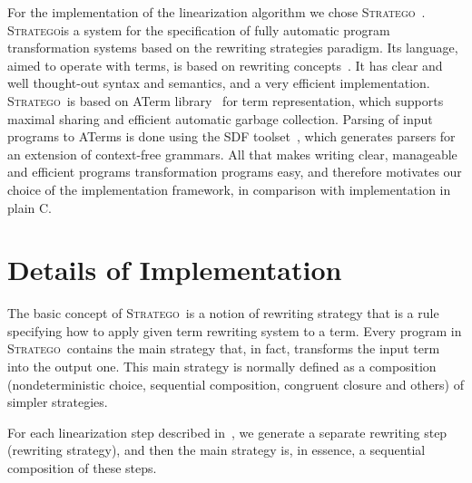 \documentclass[fleqn]{llncs}
\newcommand{\stratego}{\textsc{Stratego}}
\begin{document}
For the implementation of the linearization algorithm we chose
\stratego~\cite{Vis01}. \stratego is a system for the specification of
fully automatic program transformation systems based on the rewriting
strategies paradigm. Its language, aimed to operate with terms, is
based on rewriting concepts~\cite{BN99}. It has clear and well
thought-out syntax and semantics, and a very efficient implementation.
\stratego\ is based on ATerm library~\cite{BJKO00} for term
representation, which supports maximal sharing and efficient automatic
garbage collection. Parsing of input programs to ATerms is done using
the SDF toolset~\cite{Vis97}, which generates parsers for an extension
of context-free grammars. All that makes writing clear, manageable and
efficient programs transformation programs easy, and therefore
motivates our choice of the implementation framework, in comparison
with implementation in plain C.

\section{Details of Implementation}
The basic concept of \stratego\ is a notion of rewriting strategy that
is a rule specifying how to apply given term rewriting system to a
term. Every program in \stratego\ contains the main strategy that, in
fact, transforms the input term into the output one.  This main
strategy is normally defined as a composition (nondeterministic
choice, sequential composition, congruent closure and others) of
simpler strategies.

For each linearization step described in~\cite{Use02}, we generate a
separate rewriting step (rewriting strategy), and then the main
strategy is, in essence, a sequential composition of these steps.
\end{document}
